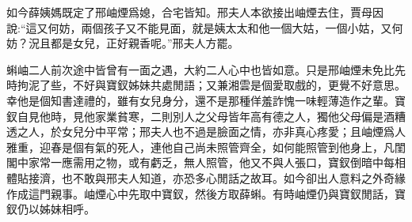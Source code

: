 \begin{parag}
    如今薛姨媽既定了邢岫煙爲媳，合宅皆知。邢夫人本欲接出岫煙去住，賈母因說:“這又何妨，兩個孩子又不能見面，就是姨太太和他一個大姑，一個小姑，又何妨？況且都是女兒，正好親香呢。”邢夫人方罷。
\end{parag}


\begin{parag}
    蝌岫二人前次途中皆曾有一面之遇，大約二人心中也皆如意。只是邢岫煙未免比先時拘泥了些，不好與寶釵姊妹共處閒語；又兼湘雲是個愛取戲的，更覺不好意思。幸他是個知書達禮的，雖有女兒身分，還不是那種佯羞詐愧一味輕薄造作之輩。寶釵自見他時，見他家業貧寒，二則別人之父母皆年高有德之人，獨他父母偏是酒糟透之人，於女兒分中平常；邢夫人也不過是臉面之情，亦非真心疼愛；且岫煙爲人雅重，迎春是個有氣的死人，連他自己尚未照管齊全，如何能照管到他身上，凡閨閣中家常一應需用之物，或有虧乏，無人照管，他又不與人張口，寶釵倒暗中每相體貼接濟，也不敢與邢夫人知道，亦恐多心閒話之故耳。如今卻出人意料之外奇緣作成這門親事。岫煙心中先取中寶釵，然後方取薛蝌。有時岫煙仍與寶釵閒話，寶釵仍以姊妹相呼。
\end{parag}


